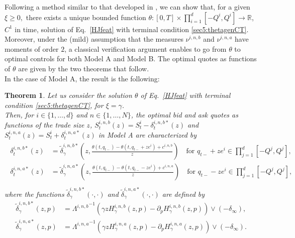 \documentclass[preprint, 3p]{elsarticle}
\newcommand{\Rr}{{\mathbb{R}}}
\newcommand{\1}{{\chi}}
\newtheorem{theorem}{Theorem}
\begin{document}
Following a method similar to that developed in \cite{bergault2019size}, we can show that, for a given $\xi \ge 0,$ there exists a unique bounded function $\theta:[0,T]\times \prod_{i=1}^d [-Q^i, Q^i]\to \Rr$, $C^1$ in time, solution of Eq.~\eqref{HJfeat} with terminal condition \eqref{sec5:thetagenCT}.\\

Moreover, under the (mild) assumption that the measures $\nu^{i,n,b}$ and $\nu^{i,n,a}$ have moments of order $2$, a classical verification argument enables to go from $\theta$ to optimal controls for both Model A and Model B. The optimal quotes as functions of $\theta$ are given by the two theorems that follow.\\

In the case of Model A, the result is the following:
\begin{theorem}
\label{optquotes5}
	Let us consider the solution $\theta$ of Eq.~\eqref{HJfeat} with terminal condition \eqref{sec5:thetagenCT}, for $\xi=\gamma$.\\
	
	Then, for $i \in \{1, \ldots, d\}$ and $n \in \{1,\ldots,N\}$, the optimal bid and ask quotes as functions of the trade size $z$, $S^{i,n,b}_t(z) = S^i_t - \delta^{i,n,b*}_t(z)$ and $S^{i,n,a}_t(z) = S^i_t + \delta^{i,n,a*}_t(z)$ in Model A are characterized by\begin{align*}
	\begin{split}
	\delta^{i,n,b*}_t(z) &= \tilde{\delta}^{i,n,b*}_\gamma\left(z,\frac{\theta(t,q_{t-}) - \theta(t,q_{t-}+z e^i)  + c^{i,n,b}}{z}\right) \quad \text{for } q_{t-}+z e^i \in \prod_{j=1}^d[-Q^j,Q^j],\\
	\delta^{i,n,a*}_t(z) &= \tilde{\delta}^{i,n,a*}_\gamma\left(z,\frac{\theta(t,q_{t-}) - \theta(t,q_{t-}-z e^i) + c^{i,n,a}}{z}\right) \quad \text{for } q_{t-}-z e^i \in \prod_{j=1}^d[-Q^j,Q^j],\\
	\end{split}
	\end{align*}where the functions $\tilde{\delta}^{i,n,b*}_\gamma(\cdot,\cdot)$ and $\tilde{\delta}_\gamma^{i,n,a*}(\cdot, \cdot)$ are defined by
	\begin{align*}
	\tilde{\delta}^{i,n,b*}_\gamma(z,p) &= {\Lambda^{i,n,b}}^{-1}\left(\gamma z H^{i,n,b}_{\gamma}(z,p) - {\partial_p H_{\gamma}^{i,n,b}}(z,p)\right) \vee (-\delta_\infty) ,\\
	\tilde{\delta}^{i,n,a*}_\gamma(z,p) &= {\Lambda^{i,n,a}}^{-1}\left(\gamma z H^{i,n,a}_{\gamma}(z,p) - {\partial_pH_{\gamma}^{i,n,a}}(z,p)\right) \vee (-\delta_\infty).
	\end{align*}	
\end{theorem}
\end{document}
